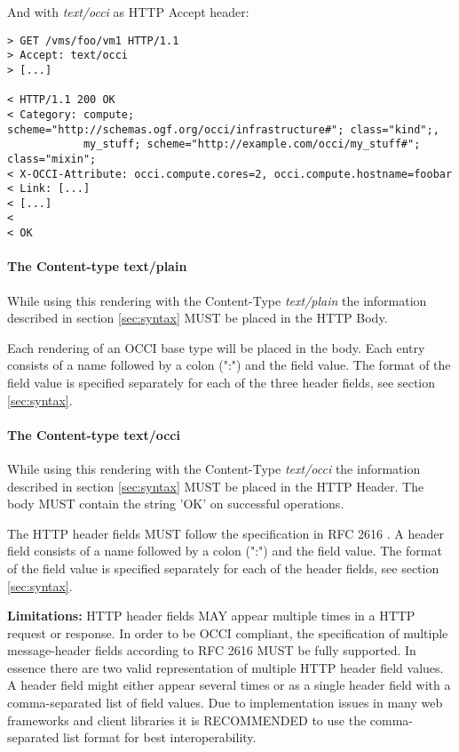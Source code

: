 \documentclass[10pt,a4paper]{article}
\begin{document}
And with \emph{text/occi} as HTTP Accept header:

\begin{verbatim}
> GET /vms/foo/vm1 HTTP/1.1
> Accept: text/occi
> [...]

< HTTP/1.1 200 OK
< Category: compute; scheme="http://schemas.ogf.org/occi/infrastructure#"; class="kind";,
            my_stuff; scheme="http://example.com/occi/my_stuff#"; class="mixin";
< X-OCCI-Attribute: occi.compute.cores=2, occi.compute.hostname=foobar
< Link: [...]
< [...]
<
< OK
\end{verbatim}

\paragraph{The Content-type text/plain}
While using this rendering with the Content-Type \textit{text/plain}
the information described in section \ref{sec:syntax} MUST be placed
in the HTTP Body.

Each rendering of an OCCI base type will be placed in the body. Each
entry consists of a name followed by a colon (":") and the field
value. The format of the field value is specified separately for each
of the three header fields, see section \ref{sec:syntax}.

\paragraph{The Content-type text/occi}
While using this rendering with the Content-Type \textit{text/occi}
the information described in section \ref{sec:syntax} MUST be placed
in the HTTP Header. The body MUST contain the string 'OK' on
successful operations.

The HTTP header fields MUST follow the specification in RFC 2616
\cite{rfc2616}. A header field consists of a name followed by a colon
(":") and the field value. The format of the field value is specified
separately for each of the header fields, see section
\ref{sec:syntax}.

\textbf{Limitations: } HTTP header fields MAY appear multiple times in
a HTTP request or response. In order to be OCCI compliant, the
specification of multiple message-header fields according to RFC 2616
MUST be fully supported. In essence there are two valid representation
of multiple HTTP header field values. A header field might either
appear several times or as a single header field with a
comma-separated list of field values. Due to implementation issues in
many web frameworks and client libraries it is RECOMMENDED to use the
comma-separated list format for best interoperability.
\end{document}
